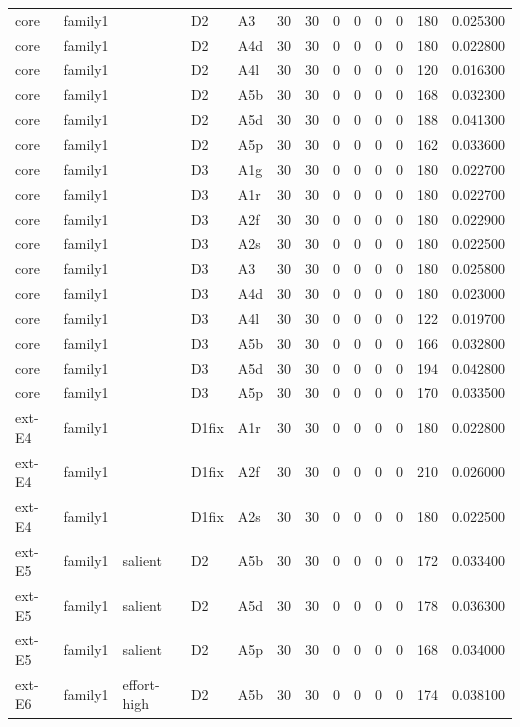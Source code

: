 \begin{tabular}{lllllrrrrrrrr}
core & family1 &  & D2 & A3 & 30 & 30 & 0 & 0 & 0 & 0 & 180 & 0.025300 \\
core & family1 &  & D2 & A4d & 30 & 30 & 0 & 0 & 0 & 0 & 180 & 0.022800 \\
core & family1 &  & D2 & A4l & 30 & 30 & 0 & 0 & 0 & 0 & 120 & 0.016300 \\
core & family1 &  & D2 & A5b & 30 & 30 & 0 & 0 & 0 & 0 & 168 & 0.032300 \\
core & family1 &  & D2 & A5d & 30 & 30 & 0 & 0 & 0 & 0 & 188 & 0.041300 \\
core & family1 &  & D2 & A5p & 30 & 30 & 0 & 0 & 0 & 0 & 162 & 0.033600 \\
core & family1 &  & D3 & A1g & 30 & 30 & 0 & 0 & 0 & 0 & 180 & 0.022700 \\
core & family1 &  & D3 & A1r & 30 & 30 & 0 & 0 & 0 & 0 & 180 & 0.022700 \\
core & family1 &  & D3 & A2f & 30 & 30 & 0 & 0 & 0 & 0 & 180 & 0.022900 \\
core & family1 &  & D3 & A2s & 30 & 30 & 0 & 0 & 0 & 0 & 180 & 0.022500 \\
core & family1 &  & D3 & A3 & 30 & 30 & 0 & 0 & 0 & 0 & 180 & 0.025800 \\
core & family1 &  & D3 & A4d & 30 & 30 & 0 & 0 & 0 & 0 & 180 & 0.023000 \\
core & family1 &  & D3 & A4l & 30 & 30 & 0 & 0 & 0 & 0 & 122 & 0.019700 \\
core & family1 &  & D3 & A5b & 30 & 30 & 0 & 0 & 0 & 0 & 166 & 0.032800 \\
core & family1 &  & D3 & A5d & 30 & 30 & 0 & 0 & 0 & 0 & 194 & 0.042800 \\
core & family1 &  & D3 & A5p & 30 & 30 & 0 & 0 & 0 & 0 & 170 & 0.033500 \\
ext-E4 & family1 &  & D1fix & A1r & 30 & 30 & 0 & 0 & 0 & 0 & 180 & 0.022800 \\
ext-E4 & family1 &  & D1fix & A2f & 30 & 30 & 0 & 0 & 0 & 0 & 210 & 0.026000 \\
ext-E4 & family1 &  & D1fix & A2s & 30 & 30 & 0 & 0 & 0 & 0 & 180 & 0.022500 \\
ext-E5 & family1 & salient & D2 & A5b & 30 & 30 & 0 & 0 & 0 & 0 & 172 & 0.033400 \\
ext-E5 & family1 & salient & D2 & A5d & 30 & 30 & 0 & 0 & 0 & 0 & 178 & 0.036300 \\
ext-E5 & family1 & salient & D2 & A5p & 30 & 30 & 0 & 0 & 0 & 0 & 168 & 0.034000 \\
ext-E6 & family1 & effort-high & D2 & A5b & 30 & 30 & 0 & 0 & 0 & 0 & 174 & 0.038100 \\

\end{tabular}
